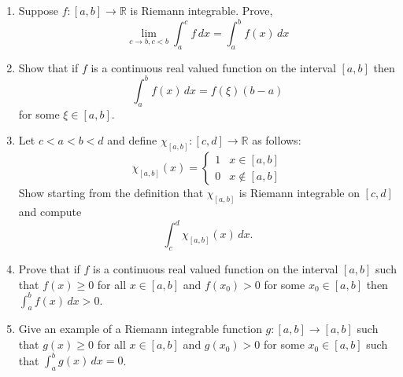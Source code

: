 \documentclass[12pt,letterpaper]{article}
\theoremstyle{plain}
\theoremstyle{definition}
\begin{document}
\begin{enumerate}[1.]
\item Suppose $f:[a,b]\rightarrow \mathbb{R}$ is Riemann integrable. Prove,
\[\lim_{c\rightarrow b, c<b}\int_a^c f\, dx=\int_a^b f(x)\, dx\]
\item Show that if $f$ is a continuous real valued function on the interval $[a,b]$ then 
\[\int_a^b f(x)\, dx = f(\xi) (b-a)\]
for some $\xi\in [a,b]$.
\item Let $c<a<b<d$ and define  $\chi_{[a,b]}:[c,d]\rightarrow \mathbb{R}$ as follows:
\[\chi_{[a,b]}(x)=\left\{\begin{array}{lr}1 & x\in [a,b]\\ 0 & x\not\in [a,b]\end{array}\right.\]
Show starting from the definition that $\chi_{[a,b]}$ is Riemann integrable on $[c,d]$ and compute 
\[\int_c^d \chi_{[a,b]}(x) \, dx.\]
\item Prove that if $f$ is a continuous real valued function on the interval $[a,b]$ such that $f(x)\geq 0$ for all $x\in [a,b]$ and $f(x_0)>0$ for some $x_0\in [a,b]$ then $\int_a^b f(x)\, dx>0$. 
\item Give an example of a Riemann integrable function $g:[a,b]\rightarrow [a,b]$ such that $g(x)\geq 0$ for all $x\in [a,b]$ and $g(x_0)>0$ for some $x_0\in [a,b]$ such that $\int_a^b g(x)\, dx=0$.
\end{enumerate}
\end{document}
